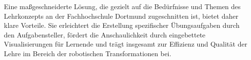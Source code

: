 Eine maßgeschneiderte Lösung, die gezielt auf die Bedürfnisse und Themen des Lehrkonzepts an der Fachhochschule Dortmund zugeschnitten ist, bietet daher klare Vorteile.
Sie erleichtert die Erstellung spezifischer Übungsaufgaben durch den Aufgabensteller,
fördert die Anschaulichkeit durch eingebettete Visualisierungen für Lernende und trägt insgesamt zur Effizienz und Qualität der Lehre im Bereich der robotischen Transformationen bei.

